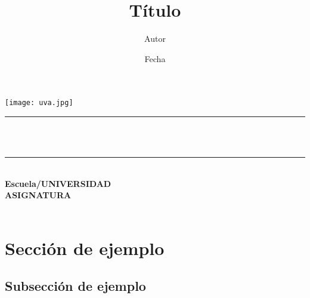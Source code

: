 \documentclass[10pt]{article}
\title{\textbf{Título}}
\author{Autor}
\date{Fecha}
\makeatletter
\let\thetitle\@title
\let\theauthor\@author
\let\thedate\@date
\makeatother
\begin{document}
\begin{titlepage}
	\centering
    \texttt{[image: uva.jpg]}\\[0.5 cm]	%

    \rule{\linewidth}{0.2 mm} \\[0.4 cm]
	{ \huge \bfseries \thetitle}\\      %
	\rule{\linewidth}{0.2 mm} \\[1.5 cm]

    { \Large \bfseries Escuela/UNIVERSIDAD}\\[0.3 cm]
    { \Large \bfseries ASIGNATURA}\\[1 cm]
    
    \Large \theauthor
    \vspace{1.5cm} \\
    \Large \thedate

\end{titlepage}
\renewcommand{\contentsname}{Tabla de contenidos}

\newpage
\tableofcontents
\newpage

\section{Sección de ejemplo}
    \subsection{Subsección de ejemplo}


\printbibliography[heading=bibintoc,title={Bibliografía}]
\end{document}
